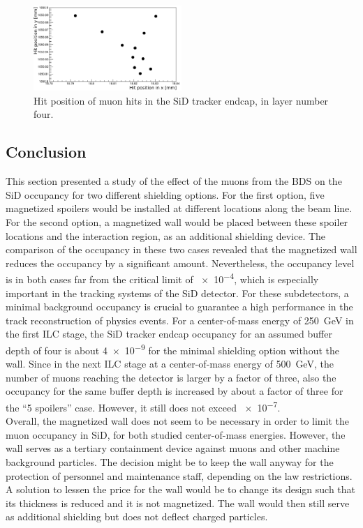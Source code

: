  \begin{figure}[htbp!]
\centering
\includegraphics[width=0.5\textwidth]{Figures/BDS_muons/LoopInACell.png}
\caption[BDS muons looping]{Hit position of muon hits in the SiD tracker endcap, in layer number four.}
\label{fig:BDS_Muons:loop}
\end{figure}

\subsection{Conclusion}
This section presented a study of the effect of the muons from the BDS on the SiD occupancy for two different shielding options.
For the first option, five magnetized spoilers would be installed at different locations along the beam line.
For the second option, a magnetized wall would be placed between these spoiler locations and the interaction region, as an additional shielding device.
The comparison of the occupancy in these two cases revealed that the magnetized wall reduces the occupancy by a significant amount.
Nevertheless, the occupancy level is in both cases far from the critical limit of \num{e-4}, which is especially important in the tracking systems of the SiD detector.
For these subdetectors, a minimal background occupancy is crucial to guarantee a high performance in the track reconstruction of physics events.
For a center-of-mass energy of \SI{250}{\GeV} in the first ILC stage, the SiD tracker endcap occupancy for an assumed buffer depth of four is about \num{4e-9} for the minimal shielding option without the wall.
Since in the next ILC stage at a center-of-mass energy of \SI{500}{\GeV}, the number of muons reaching the detector is larger by a factor of three, also the occupancy for the same buffer depth is increased by about a factor of three for the ``5 spoilers'' case.
However, it still does not exceed \num{e-7}.
\\Overall, the magnetized wall does not seem to be necessary in order to limit the muon occupancy in SiD, for both studied center-of-mass energies.
However, the wall serves as a tertiary containment device against muons and other machine background particles.
The decision might be to keep the wall anyway for the protection of personnel and maintenance staff, depending on the law restrictions.
A solution to lessen the price for the wall would be to change its design such that its thickness is reduced and it is not magnetized.
The wall would then still serve as additional shielding but does not deflect charged particles. 

